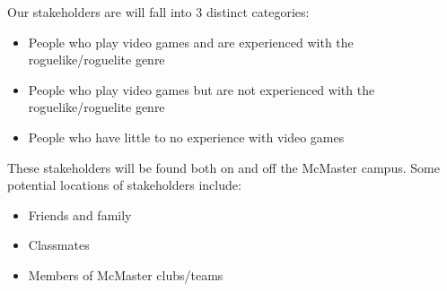 Our stakeholders are will fall into 3 distinct categories: 

\begin{itemize}

    \item People who play video games and are experienced with the roguelike/roguelite genre

    \item People who play video games but are not experienced with the roguelike/roguelite genre

    \item People who have little to no experience with video games

\end{itemize}

\noindent These stakeholders will be found both on and off the McMaster campus. Some potential locations of stakeholders include:

\begin{itemize}

    \item Friends and family

    \item Classmates

    \item Members of McMaster clubs/teams

\end{itemize}